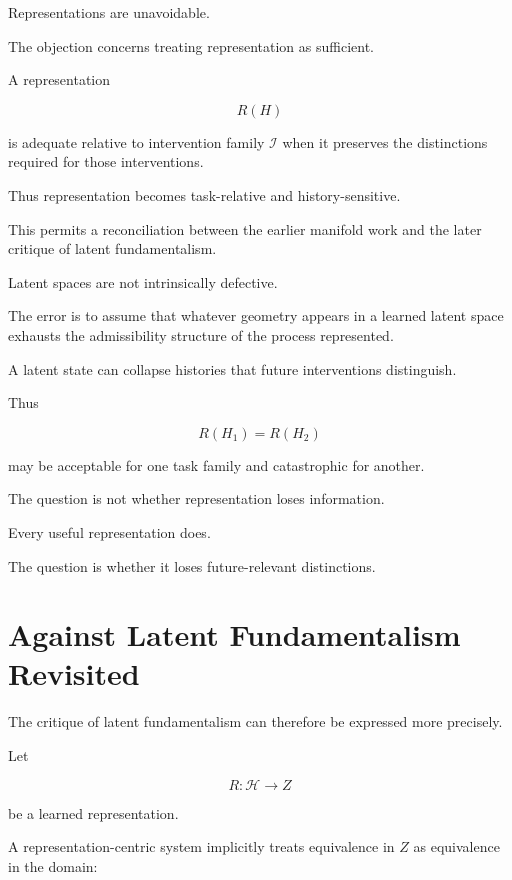 \documentclass[11pt]{article}
\theoremstyle{remark}
\begin{document}
Representations are unavoidable.

The objection concerns treating representation as sufficient.

A representation

\begin{equation}
R(H)
\end{equation}

is adequate relative to intervention family $\mathcal{I}$ when it preserves the distinctions required for those interventions.

Thus representation becomes task-relative and history-sensitive.

This permits a reconciliation between the earlier manifold work and the later critique of latent fundamentalism.

Latent spaces are not intrinsically defective.

The error is to assume that whatever geometry appears in a learned latent space exhausts the admissibility structure of the process represented.

A latent state can collapse histories that future interventions distinguish.

Thus

\begin{equation}
R(H_1)=R(H_2)
\end{equation}

may be acceptable for one task family and catastrophic for another.

The question is not whether representation loses information.

Every useful representation does.

The question is whether it loses future-relevant distinctions.

\section{Against Latent Fundamentalism Revisited}

The critique of latent fundamentalism can therefore be expressed more precisely.

Let

\begin{equation}
R:\mathcal{H}\rightarrow Z
\end{equation}

be a learned representation.

A representation-centric system implicitly treats equivalence in $Z$ as equivalence in the domain:
\end{document}
